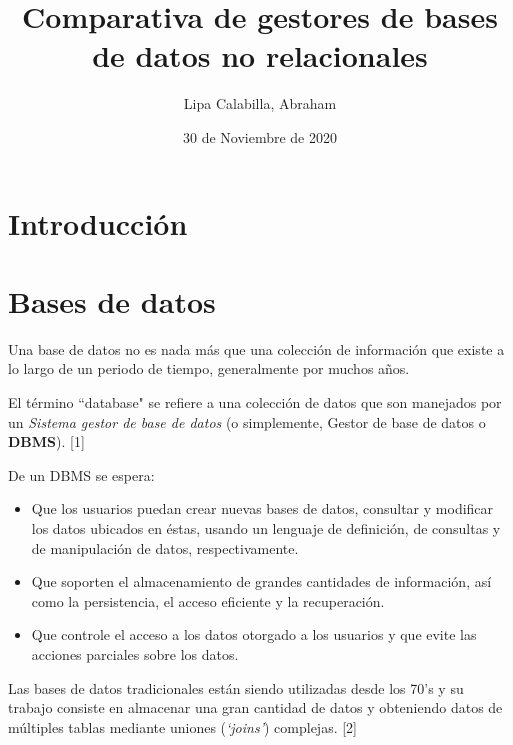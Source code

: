 \documentclass[twocolumn]{article}
\newenvironment{poliabstract}[1]
   {\renewcommand{\abstractname}{#1}\begin{abstract}}
   {\end{abstract}}
\begin{document}
\title{Comparativa de gestores de bases de datos no relacionales}
\author{Lipa Calabilla, Abraham}
\date{30 de Noviembre de 2020}

\maketitle

\begin{poliabstract}{Resumen} 
  
\end{poliabstract}

\begin{poliabstract}{Abstract} 
  
\end{poliabstract}

\section{Introducción}


\section{Bases de datos}

Una base de datos no es nada más que una colección de información que existe a lo largo de un periodo de tiempo, generalmente por muchos años.

El término ``database" se refiere a una colección de datos que son manejados por un \textit{Sistema gestor de base de datos} (o simplemente, Gestor de base de datos o \textbf{DBMS}). [1]

De un DBMS se espera:

\begin{itemize}
  \item Que los usuarios puedan crear nuevas bases de datos, consultar y modificar los datos ubicados en éstas, usando un lenguaje de definición, de consultas y de manipulación de datos, respectivamente.
  \item Que soporten el almacenamiento de grandes cantidades de información, así como la persistencia, el acceso eficiente y la recuperación.
  \item Que controle el acceso a los datos otorgado a los usuarios y que evite las acciones parciales sobre los datos.
\end{itemize}

Las bases de datos tradicionales están siendo utilizadas desde los 70's y su trabajo consiste en almacenar una gran cantidad de datos y obteniendo datos de múltiples tablas mediante uniones (\textit{`joins'}) complejas. [2]
\end{document}
